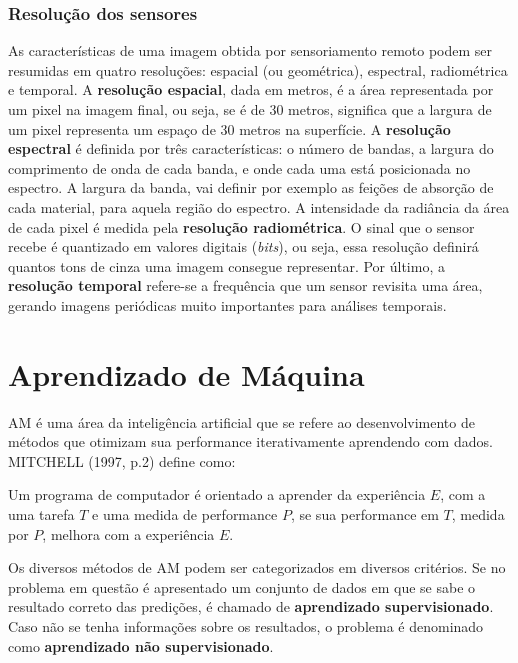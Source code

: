 \subsubsection{Resolução dos sensores}\label{resolucao}

As características de uma imagem obtida por sensoriamento remoto podem
ser resumidas em quatro resoluções: espacial (ou geométrica),
espectral, radiométrica e temporal. A \textbf{resolução espacial}, dada em metros,
é a área representada por um pixel na imagem final, ou seja, se é de 30
metros, significa que a largura de um pixel representa um espaço de 30
metros na superfície. A \textbf{resolução espectral} é definida por três
características: o número de bandas, a largura do comprimento de onda de
cada banda, e onde cada uma está posicionada no espectro. A largura da
banda, vai definir por exemplo as feições de absorção de cada material,
para aquela região do espectro. A intensidade da radiância da área de
cada pixel é medida pela \textbf{resolução radiométrica}. O sinal que o
sensor recebe é quantizado em valores digitais (\emph{bits}), ou seja,
essa resolução definirá quantos tons de cinza uma imagem consegue
representar. Por último, a \textbf{resolução temporal} refere-se a
frequência que um sensor revisita uma área, gerando imagens periódicas
muito importantes para análises temporais. \cite{meneses2012introduccao}

\section{Aprendizado de Máquina}\label{aprendizado-de-maquina}

\acs{AM} é uma área da inteligência artificial que
se refere ao desenvolvimento de métodos que otimizam sua performance
iterativamente aprendendo com dados. MITCHELL (1997, p.2) define como:

\begin{citacao}
Um programa de computador é orientado a aprender da experiência $E$, com
a uma tarefa $T$ e uma medida de performance $P$, se sua performance em
$T$, medida por $P$, melhora com a experiência $E$.
\end{citacao}

Os diversos métodos de AM podem ser categorizados em diversos
critérios. Se no problema em questão é apresentado um conjunto de dados
em que se sabe o resultado correto das predições, é chamado de
\textbf{aprendizado supervisionado}. Caso não se tenha informações sobre
os resultados, o problema é denominado como \textbf{aprendizado não
supervisionado}.

